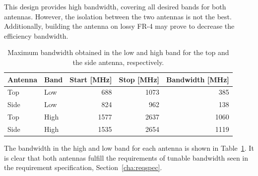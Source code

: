 This design provides high bandwidth, covering all desired bands for both antennas. However, the isolation between the two antennas is not the best. Additionally, building the antenna on lossy FR-4 may prove to decrease the efficiency bandwidth.

\begin{table}[htbp]
    \centering
    \begin{tabular}{|l|l|r|r|r|}
        \hline
        Antenna & Band & Start [MHz] & Stop [MHz] & Bandwidth [MHz] \\
        \hline
        Top     & Low  & 688         & 1073       & 385 \\
        Side    & Low  & 824         & 962        & 138 \\
        \hline
        Top     & High & 1577        & 2637       & 1060 \\
        Side    & High & 1535        & 2654       & 1119 \\
        \hline
    \end{tabular}
    \caption{Maximum bandwidth obtained in the low and high band for the top and the side antenna, respectively.}
    \label{tab:bw_sol2}
\end{table}

The bandwidth in the high and low band for each antenna is shown in Table~\ref{tab:bw_sol2}. It is clear that both antennas fulfill the requirements of tunable bandwidth seen in the requirement specification, Section~\ref{cha:reqspec}.

